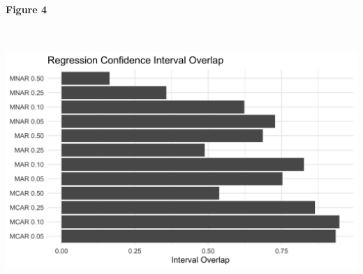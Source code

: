 \documentclass[11pt]{article}
\begin{document}
\textbf{Figure 4}

\includegraphics[width=6.5in, height=4in]{credible-interval-overlap-overall-1}

\newpage



\end{document}
